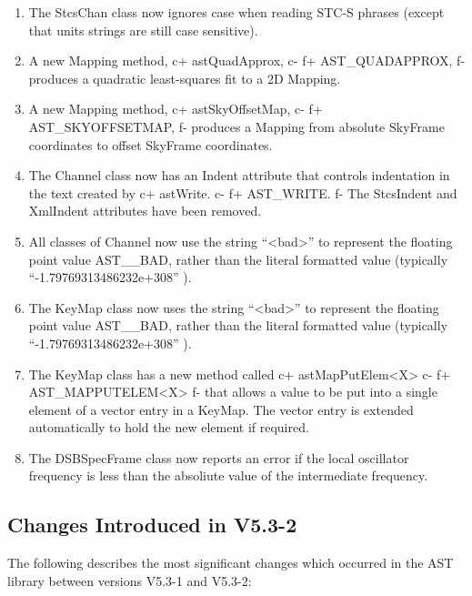 \documentclass[twoside,11pt]{starlink}
\begin{document}
\begin{enumerate}
\item The StcsChan class now ignores case when reading STC-S phrases (except
that units strings are still case sensitive).

\item A new Mapping method,
c+
astQuadApprox,
c-
f+
AST\_QUADAPPROX,
f-
produces a quadratic least-squares fit to a 2D Mapping.

\item A new Mapping method,
c+
astSkyOffsetMap,
c-
f+
AST\_SKYOFFSETMAP,
f-
produces a Mapping from absolute SkyFrame coordinates to offset SkyFrame
coordinates.

\item The Channel class now has an Indent attribute that controls indentation
in the text created by
c+
astWrite.
c-
f+
AST\_WRITE.
f-
The StcsIndent and XmlIndent attributes have been removed.

\item All classes of Channel now use the string ``<bad>'' to represent the
floating point value AST\_\_BAD, rather than the literal formatted value
(typically ``-1.79769313486232e+308'' ).

\item The KeyMap class now uses the string ``<bad>'' to represent the
floating point value AST\_\_BAD, rather than the literal formatted value
(typically ``-1.79769313486232e+308'' ).

\item The KeyMap class has a new method called
c+
astMapPutElem<X>
c-
f+
AST\_MAPPUTELEM<X>
f-
that allows a value to be put into a single element of a vector entry in
a KeyMap. The vector entry is extended automatically to hold the new
element if required.

\item The DSBSpecFrame class now reports an error if the local oscillator
frequency is less than the absoliute value of the intermediate frequency.

\end{enumerate}


\subsection{Changes Introduced in V5.3-2}

The following describes the most significant changes which
occurred in the AST library between versions V5.3-1 and V5.3-2:
\end{document}
